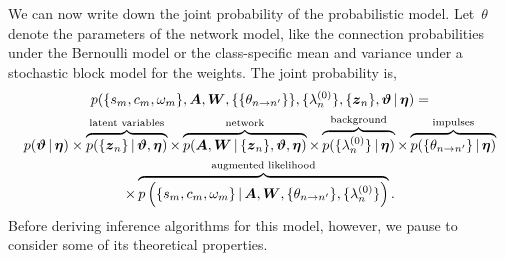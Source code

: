 We can now write down the joint probability of the probabilistic model.
Let~$\theta$ denote the parameters of the network model, like the connection
probabilities under the Bernoulli model or the class-specific mean and variance
under a stochastic block model for the weights. 
The joint probability is,
\begin{multline}
\label{eq:hawkes_complete_model}
p(\{s_m, c_m, \omega_m\}, \boldsymbol{A}, \boldsymbol{W}, \{\{\theta_{n \to n'}\}\}, \{\lambda^{(0)}_{n}\}, \{\boldsymbol{z}_n\}, \boldsymbol{\vartheta} \,|\, \boldsymbol{\eta}) 
=  \\
p(\boldsymbol{\vartheta} \,|\, \boldsymbol{\eta})
\times \overbrace{p(\{\boldsymbol{z}_n\} \,|\, \boldsymbol{\vartheta}, \boldsymbol{\eta})}^\text{latent variables}
\times \overbrace{p(\boldsymbol{A}, \boldsymbol{W} \,|\, \{\boldsymbol{z}_{n}\}, \boldsymbol{\vartheta}, \boldsymbol{\eta})}^\text{network} 
\times \overbrace{p(\{\lambda^{(0)}_{n}\} \,|\, \boldsymbol{\eta})}^\text{background}
\times \overbrace{p(\{\theta_{n\to n'}\} \,|\, \boldsymbol{\eta})}^\text{impulses} \\
\times \overbrace{  p \left(\{s_m, c_m, \omega_m\} \,|\, \boldsymbol{A}, \boldsymbol{W}, \{\theta_{n \to n'}\}, \{\lambda^{(0)}_{n}\} \right) }^\text{augmented likelihood}.
\end{multline}
Before deriving inference algorithms for this model, however, we pause 
to consider some of its theoretical properties.




